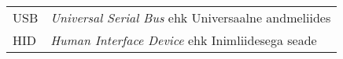\begin{longtable}{p{3cm}p{10cm}}
USB&\textit{Universal Serial Bus} ehk Universaalne andmeliides\\
	HID&\textit{Human Interface Device} ehk Inimliidesega seade\\
\end{longtable}
\addtocounter{table}{-1} 
